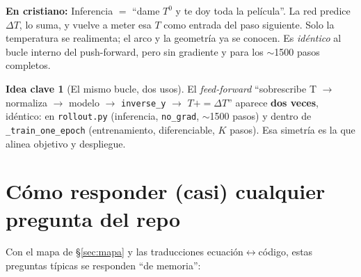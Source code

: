 \documentclass[11pt]{article}
\theoremstyle{definition}
\newtheorem{idea}{Idea clave}[section]
\theoremstyle{plain}
\newcommand{\dummies}[1]{%
  \par\smallskip\noindent
  \colorbox{yellow!18}{\parbox{\dimexpr\linewidth-2\fboxsep}{%
  \small\textbf{En cristiano:} #1}}\par\smallskip}
\begin{document}
\dummies{Inferencia $=$ ``dame $T^0$ y te doy toda la película''. La red predice
$\Delta T$, lo suma, y vuelve a meter esa $T$ como entrada del paso siguiente.
Solo la temperatura se realimenta; el arco y la geometría ya se conocen. Es
\emph{idéntico} al bucle interno del push-forward, pero sin gradiente y para los
$\sim$1500 pasos completos.}

\begin{idea}[El mismo bucle, dos usos]
El \emph{feed-forward} ``sobrescribe T $\rightarrow$ normaliza $\rightarrow$ modelo
$\rightarrow$ \texttt{inverse\_y} $\rightarrow$ $T{+}{=}\Delta T$'' aparece
\textbf{dos veces}, idéntico: en \texttt{rollout.py} (inferencia, \texttt{no\_grad},
$\sim$1500 pasos) y dentro de \texttt{\_train\_one\_epoch} (entrenamiento,
diferenciable, $K$ pasos). Esa simetría es la que alinea objetivo y despliegue.
\end{idea}

\section{Cómo responder (casi) cualquier pregunta del repo}
\label{sec:faq}

Con el mapa de §\ref{sec:mapa} y las traducciones ecuación$\leftrightarrow$código,
estas preguntas típicas se responden ``de memoria'':
\end{document}
